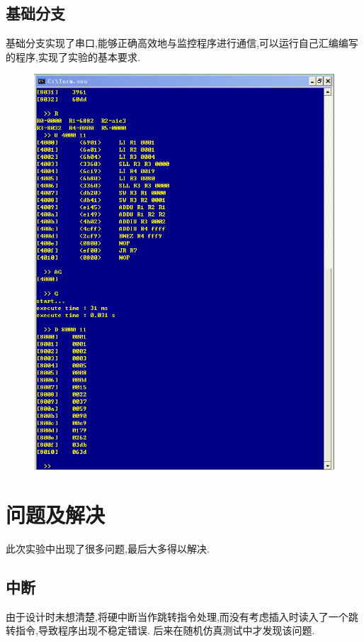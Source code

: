 \subsection{基础分支}
基础分支实现了串口,能够正确高效地与监控程序进行通信,可以运行自己汇编编写的程序,实现了实验的基本要求.
\begin{figure}[H]
  \centering
  \includegraphics[width=\textwidth]{figure/result.png}
\end{figure}


\section{问题及解决}
此次实验中出现了很多问题,最后大多得以解决.
\subsection{中断}
由于设计时未想清楚,将硬中断当作跳转指令处理,而没有考虑插入时读入了一个跳转指令,导致程序出现不稳定错误.
后来在随机仿真测试中才发现该问题.
